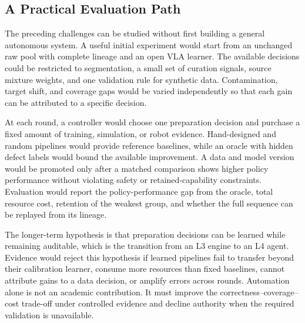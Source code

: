 \subsection{A Practical Evaluation Path}

The preceding challenges can be studied without first building a general autonomous system.
A useful initial experiment would start from an unchanged raw pool with complete lineage and an open VLA learner.
The available decisions could be restricted to segmentation, a small set of curation signals, source mixture weights, and one validation rule for synthetic data.
Contamination, target shift, and coverage gaps would be varied independently so that each gain can be attributed to a specific decision.

At each round, a controller would choose one preparation decision and purchase a fixed amount of training, simulation, or robot evidence.
Hand-designed and random pipelines would provide reference baselines, while an oracle with hidden defect labels would bound the available improvement.
A data and model version would be promoted only after a matched comparison shows higher policy performance without violating safety or retained-capability constraints.
Evaluation would report the policy-performance gap from the oracle, total resource cost, retention of the weakest group, and whether the full sequence can be replayed from its lineage.

The longer-term hypothesis is that preparation decisions can be learned while remaining auditable, which is the transition from an L3 engine to an L4 agent.
Evidence would reject this hypothesis if learned pipelines fail to transfer beyond their calibration learner, consume more resources than fixed baselines, cannot attribute gains to a data decision, or amplify errors across rounds.
Automation alone is not an academic contribution.
It must improve the correctness--coverage--cost trade-off under controlled evidence and decline authority when the required validation is unavailable.
